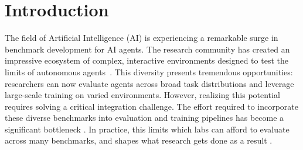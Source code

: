 \documentclass{article}
\theoremstyle{plain}
\theoremstyle{definition}
\theoremstyle{remark}
\begin{document}

\printAffiliationsAndNotice{}  %

\begin{abstract}
    The proliferation of agent benchmarks has created critical fragmentation that threatens research productivity. Each new benchmark requires substantial custom integration, creating an ``integration tax'' that limits comprehensive evaluation. \textbf{We propose CUBE (Common Unified Benchmark Environments), a universal protocol standard built on MCP and Gym that allows benchmarks to be wrapped once and used everywhere}. By separating task, benchmark, package, and registry concerns into distinct API layers, CUBE enables any compliant platform to access any compliant benchmark for evaluation, RL training, or data generation without custom integration. We call on the community to contribute to the development of this standard before platform-specific implementations deepen fragmentation as benchmark production accelerates through 2026.
\end{abstract}

\section{Introduction}

The field of Artificial Intelligence (AI) is experiencing a remarkable surge in benchmark development for AI agents. The research community has created an impressive ecosystem of complex, interactive environments designed to test the limits of autonomous agents~\citep{yehudai2025surveyevaluationllmbasedagents, Mohammadi2025EvaluationAB}. This diversity presents tremendous opportunities: researchers can now evaluate agents across broad task distributions and leverage large-scale training on varied environments. However, realizing this potential requires solving a critical integration challenge. The effort required to incorporate these diverse benchmarks into evaluation and training pipelines has become a significant bottleneck \citep{bandel2026generalagentblog}. In practice, this limits which labs can afford to evaluate across many benchmarks, and shapes what research gets done as a result .
\end{document}

